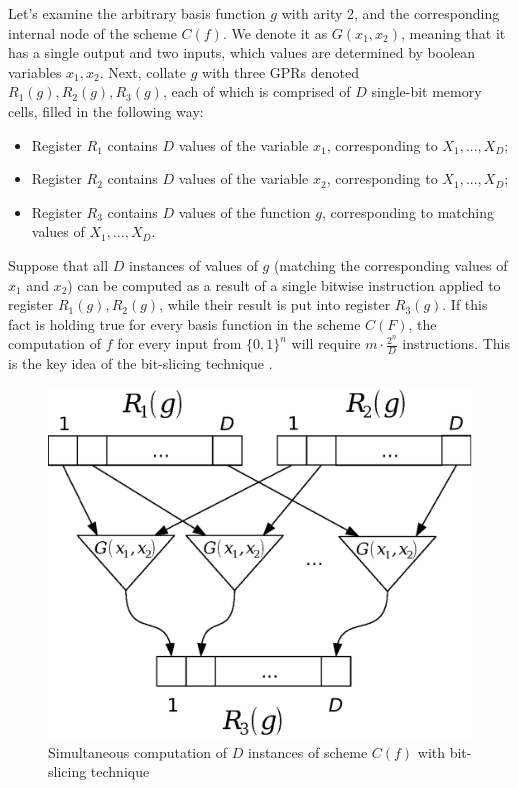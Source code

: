 \documentclass[runningheads,a4paper]{llncs}[2015/06/24]
\begin{document}
Let's examine the arbitrary basis function $g$ with arity 2, and the
corresponding internal node of the scheme $C(f)$. We denote it as $G(x_1,x_2)$,
meaning that it has a single output and two inputs, which values are determined
by boolean variables $x_1,x_2$. Next, collate $g$ with three GPRs denoted
$R_1(g),R_2(g),R_3(g)$, each of which is comprised of $D$ single-bit memory
cells, filled in the following way: 
\begin{itemize} 
\item Register $R_1$ contains $D$ values of the variable $x_1$, corresponding
 to $X_1,...,X_D$; 
\item Register $R_2$ contains $D$ values of the variable $x_2$, corresponding
 to $X_1,...,X_D$;
\item Register $R_3$ contains $D$ values of the function $g$, corresponding to
 matching values of $X_1,...,X_D$.
\end{itemize}
Suppose that all $D$ instances of values of $g$ (matching the corresponding
values of $x_1$ and $x_2$) can be computed as a result of a single bitwise
instruction applied to register $R_1(g),R_2(g)$, while their result is put into
register $R_3(g)$.  If this fact is holding true for every basis function in
the scheme $C(F)$, the computation of $f$ for every input from $\{0,1\}^n$ will
require $m\cdot\frac{2^n}{D}$ instructions. This is the key idea of the
bit-slicing technique \cite{fig:bitsl}.


\begin{figure} \includegraphics[width=\linewidth]{./bitslice.eps}
	\caption{Simultaneous computation of $D$ instances of scheme $C(f)$ with
	bit-slicing technique} \label{fig:a51gen} 
\end{figure}
\end{document}
